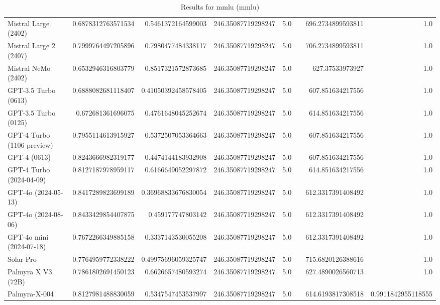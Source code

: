 \begin{table}[htp]
{\begin{tabular}{lrrrrrrr}
Mistral Large (2402) & 0.6878312763571534 & 0.5461372164599003 & 246.35087719298247 & 5.0 &  & 696.2734899593811 & 1.0 \\
Mistral Large 2 (2407) & 0.7999764497205896 & 0.7980477484338117 & 246.35087719298247 & 5.0 &  & 706.2734899593811 & 1.0 \\
Mistral NeMo (2402) & 0.6532946316803779 & 0.8517321572873685 & 246.35087719298247 & 5.0 &  & 627.37533973927 & 1.0 \\
GPT-3.5 Turbo (0613) & 0.6888082681118407 & 0.41050392458578405 & 246.35087719298247 & 5.0 &  & 607.851634217556 & 1.0 \\
GPT-3.5 Turbo (0125) & 0.672681361696075 & 0.4761648045252674 & 246.35087719298247 & 5.0 &  & 614.851634217556 & 1.0 \\
GPT-4 Turbo (1106 preview) & 0.7955114613915927 & 0.5372507053364663 & 246.35087719298247 & 5.0 &  & 607.851634217556 & 1.0 \\
GPT-4 (0613) & 0.8243666982319177 & 0.4474144183932908 & 246.35087719298247 & 5.0 &  & 607.851634217556 & 1.0 \\
GPT-4 Turbo (2024-04-09) & 0.8127187978959117 & 0.6166649052297872 & 246.35087719298247 & 5.0 &  & 614.851634217556 & 1.0 \\
GPT-4o (2024-05-13) & 0.8417289823699189 & 0.36968833676830054 & 246.35087719298247 & 5.0 &  & 612.3317391408492 & 1.0 \\
GPT-4o (2024-08-06) & 0.8433429854407875 & 0.459177747803142 & 246.35087719298247 & 5.0 &  & 612.3317391408492 & 1.0 \\
GPT-4o mini (2024-07-18) & 0.7672266349885158 & 0.3337143530055208 & 246.35087719298247 & 5.0 &  & 612.3317391408492 & 1.0 \\
Solar Pro & 0.7764959772338222 & 0.49975696059325747 & 246.35087719298247 & 5.0 &  & 715.6820126388616 & 1.0 \\
Palmyra X V3 (72B) & 0.7861802691450123 & 0.6626657480593274 & 246.35087719298247 & 5.0 &  & 627.4890026560713 & 1.0 \\
Palmyra-X-004 & 0.8127981488830059 & 0.5347547453537997 & 246.35087719298247 & 5.0 &  & 614.6193817308518 & 0.9911842955118555 \\
\bottomrule
\end{tabular}}
\caption{Results for mmlu (mmlu)}
\label{fig:mmlu (mmlu)}
\end{table}